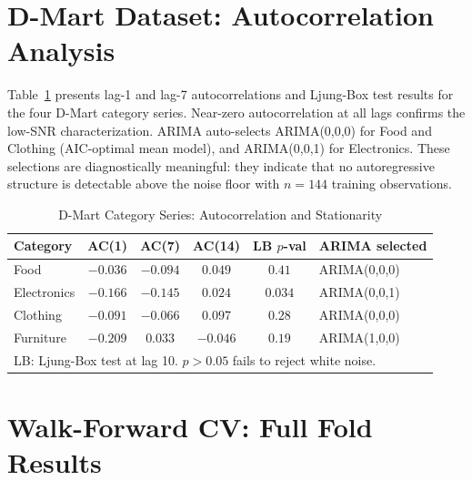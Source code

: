 \documentclass[journal]{IEEEtran}
\begin{document}
\section{D-Mart Dataset: Autocorrelation Analysis}
\label{app:eda}

Table~\ref{tab:acf} presents lag-1 and lag-7 autocorrelations and Ljung-Box test results for the four D-Mart category series. Near-zero autocorrelation at all lags confirms the low-SNR characterization. ARIMA auto-selects ARIMA(0,0,0) for Food and Clothing (AIC-optimal mean model), and ARIMA(0,0,1) for Electronics. These selections are diagnostically meaningful: they indicate that no autoregressive structure is detectable above the noise floor with $n{=}144$ training observations.

\begin{table}[h]
\centering
\caption{D-Mart Category Series: Autocorrelation and Stationarity}
\label{tab:acf}
\begin{tabular}{lccccl}
\toprule
\textbf{Category} & \textbf{AC(1)} & \textbf{AC(7)} & \textbf{AC(14)} & \textbf{LB $p$-val} & \textbf{ARIMA selected} \\
\midrule
Food        & $-0.036$ & $-0.094$ & $0.049$ & $0.41$ & ARIMA(0,0,0) \\
Electronics & $-0.166$ & $-0.145$ & $0.024$ & $0.034$ & ARIMA(0,0,1) \\
Clothing    & $-0.091$ & $-0.066$ & $0.097$ & $0.28$ & ARIMA(0,0,0) \\
Furniture   & $-0.209$ & $ 0.033$ & $-0.046$ & $0.19$ & ARIMA(1,0,0) \\
\bottomrule
\multicolumn{6}{l}{\small LB: Ljung-Box test at lag 10. $p{>}0.05$ fails to reject white noise.}
\end{tabular}
\end{table}

\section{Walk-Forward CV: Full Fold Results}
\label{app:wfcv}
\end{document}
